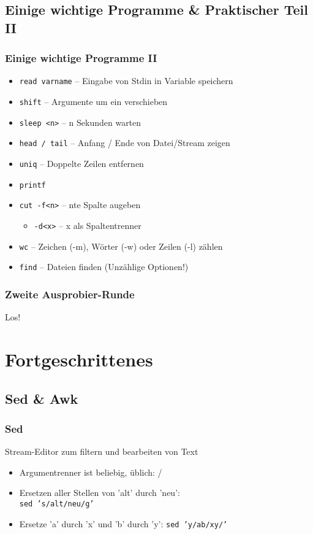 \documentclass{beamer}
\begin{document}
\subsection{Einige wichtige Programme \& Praktischer Teil II}
\begin{frame}[<+->]
 \frametitle{Einige wichtige Programme II}
 \begin{itemize}
  \item {\tt read varname} -- Eingabe von Stdin in Variable speichern
  \item {\tt shift} -- Argumente um ein verschieben
  \item {\tt sleep <n>} -- n Sekunden warten
  \item {\tt head / tail} -- Anfang / Ende von Datei/Stream zeigen
  \item {\tt uniq} -- Doppelte Zeilen entfernen
  \item {\tt printf}
  \item {\tt cut -f<n>} -- nte Spalte augeben
   \begin{itemize}
    \item {\tt -d<x>} -- x als Spaltentrenner
   \end{itemize}
  \item {\tt wc} -- Zeichen (-m), Wörter (-w) oder Zeilen (-l) zählen
  \item {\tt find} -- Dateien finden (Unzählige Optionen!)
 \end{itemize}
\end{frame}

\begin{frame}
 \frametitle{Zweite Ausprobier-Runde}
 \begin{center}
 Los!
 \end{center}
\end{frame}

\section{Fortgeschrittenes}
\subsection{Sed \& Awk}
\begin{frame}
 \frametitle{Sed}
 Stream-Editor zum filtern und bearbeiten von Text
 
 \begin{itemize}
  \item Argumentrenner ist beliebig, üblich: /
  \item Ersetzen aller Stellen von 'alt' durch 'neu': \\ {\tt sed 's/alt/neu/g'}
  \item Ersetze 'a' durch 'x' und 'b' durch 'y': {\tt sed 'y/ab/xy/'}
 \end{itemize}
\end{frame}
\end{document}
